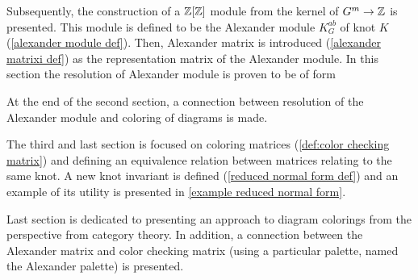 Subsequently, the construction of a $\operatorname{\mathbb{Z}}[\operatorname{\mathbb{Z}}]$ module from the kernel of $G^m\to \operatorname{\mathbb{Z}}$ is presented. This module is defined to be the Alexander module $K_G^{ab}$ of knot $K$ (\cref{alexander module def}). Then, Alexander matrix is introduced (\cref{alexander matrixi def}) as the representation matrix of the Alexander module. In this section the resolution of Alexander module is proven to be of form  
\begin{center}
\end{center}
At the end of the second section, a connection between resolution of the Alexander module and coloring of diagrams is made.

The third and last section is focused on coloring matrices (\cref{def:color checking matrix}) and defining an equivalence relation between matrices relating to the same knot. A new knot invariant is defined (\cref{reduced normal form def}) and an example of its utility is presented in \cref{example reduced normal form}.

Last section is dedicated to presenting an approach to diagram colorings from the perspective from category theory. In addition, a connection between the Alexander matrix and color checking matrix (using a particular palette, named the Alexander palette) is presented.
